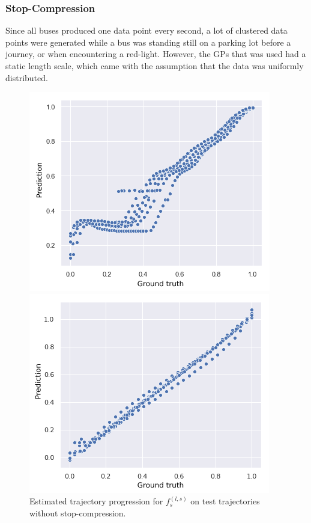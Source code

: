 \subsubsection{Stop-Compression}
\label{sec:stop-compression}
Since all buses produced one data point every second, a lot of
clustered data points were generated while a bus was standing still on
a parking lot before a journey, or when encountering a
red-light. However, the GPs that was used had a static length scale, which came with the assumption that the data was uniformly distributed.

\begin{figure}[H]
  \begin{minipage}{.46\textwidth}
    \includegraphics[scale=0.48,width=\textwidth]{figures/traj-without-stop-compression3.png}
    \caption{Estimated trajectory progression for $f_s^{(l, s)}$ on test trajectories without stop-compression.}
    \label{fig:progression-without-stop-compression}
  \end{minipage}
  \hspace{5pt}
  \begin{minipage}{.46\textwidth}
    \includegraphics[scale=0.5,width=\textwidth]{figures/traj-with-stop-compression3.png}

\end{minipage}
\end{figure}
